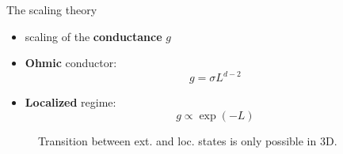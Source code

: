 \documentclass[1pt]{beamer}
\begin{document}
\begin{frame}{The scaling theory }
\begin{minipage}[c]{0.38\textwidth}
\begin{itemize}
\item scaling of the \textbf{conductance} $g$
\vspace{15mm}
\item \textbf{Ohmic} conductor:
$$g=\sigma L^{d-2}$$
\vspace{5mm}
\item \textbf{Localized} regime:
$$g\propto \exp(-L)$$
\end{itemize}
\end{minipage}\hfill
\begin{minipage}[c]{0.6\textwidth}
\begin{figure}
\caption{Transition between ext. and loc. states is only possible in 3D.}
\end{figure}
\end{minipage}
\end{frame}
\end{document}
